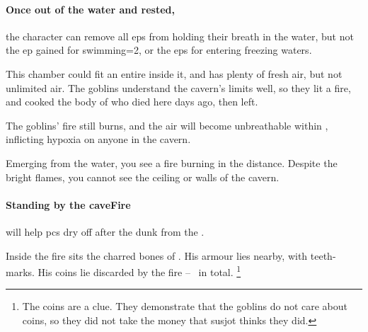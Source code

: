 \begin{multicols}{2}
\paragraph{Once out of the water and rested,}
the character can remove all \glspl{ep} from holding their breath in the water, but not the \gls{ep} gained for swimming\ifnum\value{temperature}=2\else, or the \glspl{ep} for entering freezing waters\fi.




\begin{exampletext}
  This chamber could fit an entire  inside it, and has plenty of fresh air, but not unlimited air.
  The goblins understand the cavern's limits well, so they lit a fire, and cooked the body of  who died here days ago, then left.
\end{exampletext}

The goblins' fire still burns, and the air will become unbreathable within , inflicting \gls{hypoxia} on anyone in the cavern.

\begin{boxtext}
  Emerging from the water, you see a fire burning in the distance.
  Despite the bright flames, you cannot see the ceiling or walls of the cavern.
\end{boxtext}

\paragraph{Standing by the \gls{caveFire}}
will help \glspl{pc} dry off after the dunk from the .

Inside the fire sits the charred bones of .
His armour lies nearby, with teeth-marks.
His coins lie discarded by the fire -- \lootSmall\ in total.%
\footnote{The coins are a clue.  They demonstrate that the goblins do not care about coins, so they did not take the money that \gls{susjot} thinks they did.}
\label{caveCoinsII}
\setcounter{diceNo}{0}%
\renewcommand\npcsymbol{\currency}


\end{multicols}
